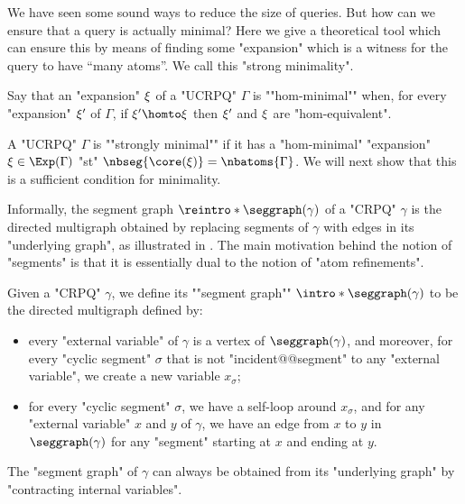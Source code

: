 We have seen some sound ways to reduce the size of queries. But how can we ensure that a query is actually minimal? Here we give a theoretical tool which can ensure this by means of finding some "expansion" which is a witness for the query to have ``many atoms''. We call this "strong minimality".

Say that an "expansion" $\xi$ of a "UCRPQ" $\Gamma$ is \AP""hom-minimal"" when, for every "expansion" $\xi'$ of $\Gamma$, if $\anexpansion' \homto \anexpansion$ then $\xi'$ and $\xi$ are "hom-equivalent". 

A "UCRPQ" $\Gamma$ is \AP""strongly minimal"" if 
it has a "hom-minimal" "expansion" $\anexpansion \in \Exp(\Gamma)$ "st" $\nbseg{\core(\anexpansion)} = \nbatoms{\Gamma}$. We will next show that this is a sufficient condition for minimality.


Informally, the segment graph $\reintro*\seggraph(\gamma)$ of a "CRPQ" $\gamma$ is the directed multigraph obtained by replacing segments of $\gamma$ with edges in its "underlying graph", as illustrated in . The main motivation behind the notion of "segments" is 
that it is essentially dual to the notion of "atom refinements".

\begin{definition}
	\AP\label{defn:segmentgraph}
	Given a "CRPQ" $\gamma$, we define its \AP""segment graph"" $\intro*\seggraph(\gamma)$
	to be the directed multigraph defined by:
	\begin{itemize}
		\item every "external variable" of $\gamma$ is a vertex of $\seggraph(\gamma)$,
			and moreover, for every "cyclic segment" $\sigma$
			that is not "incident@@segment" to any "external variable", we create a new variable
			$x_\sigma$;
		\item for every "cyclic segment" $\sigma$, we have a self-loop around $x_{\sigma}$,
			and for any "external variable" $x$ and $y$ of $\gamma$, we have an edge
			from $x$ to $y$ in $\seggraph(\gamma)$ for any "segment" starting at $x$ and
			ending at $y$.
	\end{itemize}
\end{definition}

\begin{fact}
	\AP\label{fact:segment-graph-is-contraction}
	The "segment graph" of $\gamma$ can always be obtained from its "underlying
	graph" by "contracting internal variables". 
\end{fact}

